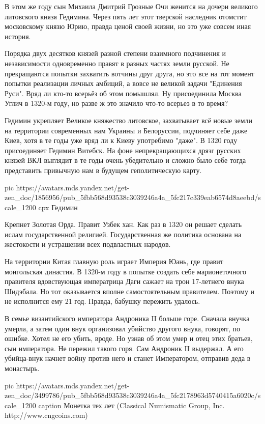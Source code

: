В этом же году сын Михаила Дмитрий Грозные Очи женится на дочери великого
литовского князя Гедимина. Через пять лет этот тверской наследник отомстит
московскому князю Юрию, правда ценой своей жизни, но это уже совсем иная
история.

Порядка двух десятков князей разной степени взаимного подчинения и
независимости одновременно правят в разных частях земли русской. Не
прекращаются попытки захватить вотчины друг друга, но это все на тот момент
попытки реализации личных амбиций, а вовсе не великой задачи "Единения Руси".
Вряд ли кто-то всерьёз об этом помышлял. Ну присоединила Москва Углич в 1320-м
году, но разве ж это значило что-то всерьез в то время?

Гедимин укрепляет Великое княжество литовское, захватывает всё новые земли на
территории современных нам Украины и Белоруссии, подчиняет себе даже Киев, хотя
в те годы уже вряд ли к Киеву употребимо "даже". В 1320 году присоединяет
Гедимин Витебск. На фоне непрекращающихся дрязг русских князей ВКЛ выглядит в
те годы очень убедительно и сложно было себе тогда представить привычную нам в
будущем геполитическую карту. 

\ifcmt
pic https://avatars.mds.yandex.net/get-zen_doc/1856956/pub_5fbb568d93538c3039246a4a_5fc217c339eab6574d8aeebd/scale_1200
cpx Гедимин
\fi

Крепнет Золотая Орда. Правит Узбек хан. Как раз в 1320 он решает сделать ислам
государственной религией. Государственная же политика основана на жестокости и
устрашении всех подвластных народов.

На территории Китая главную роль играет Империя Юань, где правит монгольская
династия. В 1320-м году в попытке создать себе марионеточного правителя
вдовствующая императрица Даги сажает на трон 17-летнего внука Шидэбала. Но тот
оказывается вполне самостоятельным правителем. Поэтому и не исполнится ему 21
год. Правда, бабушку пережить удалось.

В семье византийского императора Андроника II больше горе. Сначала внучка
умерла, а затем один внук организовал убийство другого внука, говорят, по
ошибке. Хотел не его убить, вроде. Но узнав об этом умер и отец этих братьев,
сын императора. Не пережил такого горя. Сам Андроник II выдержал. А его
убийца-внук начнет войну против него и станет Императором, отправив деда в
монастырь.

\ifcmt
pic https://avatars.mds.yandex.net/get-zen_doc/3499786/pub_5fbb568d93538c3039246a4a_5fc2178963d5740415a6020c/scale_1200
caption Монетка тех лет (Classical Numismatic Group, Inc. http://www.cngcoins.com)
\fi


